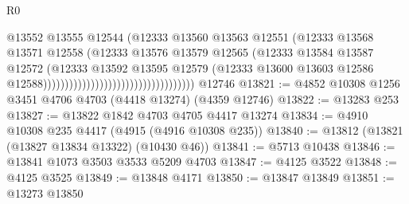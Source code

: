 \begin{lexlean}{R0}
\begin{coremodule}
                                                              @13552
                                                              @13555
                                                              @12544
                                                              (@12333
                                                                @13560
                                                                @13563
                                                                @12551
                                                                (@12333
                                                                  @13568
                                                                  @13571
                                                                  @12558
                                                                  (@12333
                                                                    @13576
                                                                    @13579
                                                                    @12565
                                                                    (@12333
                                                                      @13584
                                                                      @13587
                                                                      @12572
                                                                      (@12333
                                                                        @13592
                                                                        @13595
                                                                        @12579
                                                                        (@12333
                                                                          @13600
                                                                          @13603
                                                                          @12586
                                                                          @12588)))))))))))))))))))))))))))))))))))
    @12746
@13821 := @4852 @10308 @1256 @3451 @4706 @4703 (@4418 @13274) (@4359 @12746)
@13822 := @13283 @253
@13827 := @13822 @1842 @4703 @4705 @4417 @13274
@13834 := @4910 @10308 @235 @4417 (@4915 (@4916 @10308 @235))
@13840 := @13812 (@13821 (@13827 @13834 @13322) (@10430 @46))
@13841 := @5713 @10438
@13846 := @13841 @1073 @3503 @3533 @5209 @4703
@13847 := @4125 @3522
@13848 := @4125 @3525
@13849 := @13848 @4171
@13850 := @13847 @13849
@13851 := @13273 @13850

\end{coremodule}
\end{lexlean}

